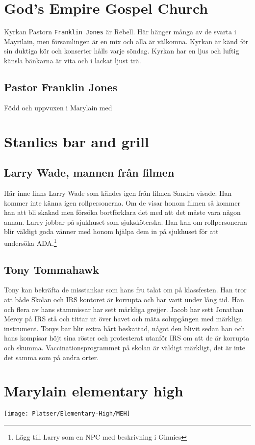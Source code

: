 \documentclass[a5paper,10pt]{report}
\begin{document}
\section{God's Empire Gospel Church}
Kyrkan Pastorn \texttt{Franklin Jones} är Rebell. Här hänger många av de svarta i Mayrilain, men församlingen är en mix och alla är välkomna. Kyrkan är känd för sin duktiga kör och konserter hålls varje söndag. Kyrkan har en ljus och luftig känsla bänkarna är vita och i lackat ljust trä.
\subsection{Pastor Franklin Jones}
Född och uppvuxen i Marylain med

\section{Stanlies bar and grill}
\subsection{Larry Wade, mannen från filmen}
Här inne finns Larry Wade som kändes igen från filmen Sandra visade. Han kommer inte känna igen rollpersonerna. Om de visar honom filmen så kommer han att bli skakad men försöka bortförklara det med att det måste vara någon annan. Larry jobbar på sjukhuset som sjuksköterska. Han kan om rollpersonerna blir väldigt goda vänner med honom hjälpa dem in på sjukhuset för att undersöka ADA.\footnote{Lägg till Larry som en NPC med beskrivning i Ginnies}
\subsection{Tony Tommahawk}
Tony kan bekräfta de misstankar som hans fru talat om på klassfesten. Han tror att både Skolan och IRS kontoret är korrupta och har varit under lång tid. Han och flera av hans stammissar har sett märkliga grejjer. Jacob har sett Jonathan Mercy på IRS stå och tittar ut över havet och mäta solupgången med märkliga instrument. Tonys bar blir extra hårt beskattad, något den blivit sedan han och hans kompisar höjt sina röster och protesterat utanför IRS om att de är korrupta och skumma. Vaccinationsprogrammet på skolan är väldigt märkligt, det är inte det samma som på andra orter.
\section{Marylain elementary high}
\texttt{[image: Platser/Elementary-High/MEH]}
\end{document}
